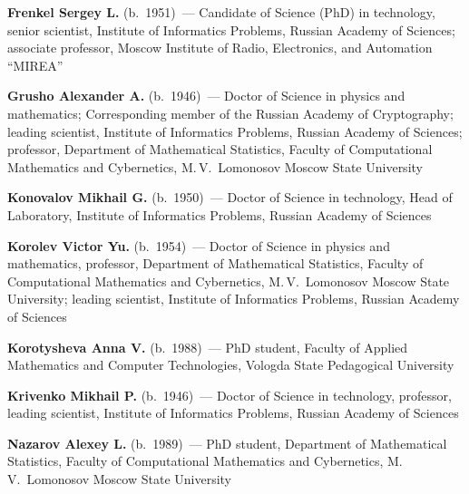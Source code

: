 \begin{multicols}{2}
\vspace*{4pt}

\noindent
\textbf{Frenkel Sergey L.} (b.\ 1951)~--- Candidate of Science (PhD) in technology,
senior scientist, Institute of Informatics Problems, Russian Academy of Sciences;
associate professor, Moscow Institute of Radio, Electronics, and Automation ``MIREA''

\vspace*{4pt}

\noindent
\textbf{Grusho Alexander A.} (b.\ 1946)~--- Doctor of Science in physics 
and mathematics; Corresponding member of the Russian Academy of
Cryptography; leading scientist, Institute of Informatics Problems,  Russian Academy of Sciences;
professor, Department of Mathematical Statistics, 
Faculty of Computational Mathematics and Cybernetics, 
M.\,V.~Lomonosov Moscow State Univer\-sity

\columnbreak

\noindent
\textbf{Konovalov Mikhail G.} (b.\ 1950)~--- Doctor of Science in technology, 
Head of Laboratory, Institute of Informatics Problems,  Russian Academy of Sciences


\vspace*{4pt}


\noindent
\textbf{Korolev Victor Yu.} (b.\ 1954)~--- Doctor of Science in physics and mathematics, 
professor, Department of Mathematical Statistics, Faculty of Computational Mathematics 
and Cybernetics, M.\,V.~Lomonosov Moscow State University; 
leading scientist, Institute of Informatics Problems, Russian Academy of Sciences

\vspace*{4pt}

\noindent
\textbf{Korotysheva Anna V.} (b.\ 1988)~--- PhD student, Faculty of Applied Mathematics and
Computer Technologies, Vologda State Pedagogical University

\vspace*{4pt}

\noindent
\textbf{Krivenko Mikhail P.} (b.\ 1946)~--- 
Doctor of Science in technology, professor, leading scientist, 
Institute of Informatics Problems, Russian Academy of Sciences  


\vspace*{4pt}

\noindent
\textbf{Nazarov Alexey L.} (b.\ 1989)~--- PhD student,
Department of Mathematical Statistics, 
Faculty of Computational Mathematics and Cybernetics, 
M.\,V.~Lomonosov Moscow State University


\end{multicols}

